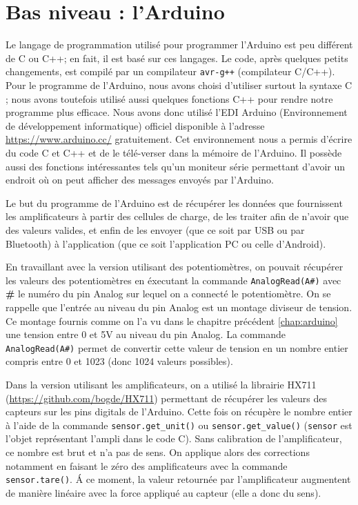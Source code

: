 \documentclass{polytech/polytech}
\begin{document}
\section{Bas niveau : l'Arduino}
\label{sec:logiciel_bas}

Le langage de programmation utilisé pour programmer l'Arduino est peu différent de C ou C++; en fait, il est basé sur ces langages. Le code, après quelques petits changements, est compilé par un compilateur \texttt{avr-g++} (compilateur C/C++). Pour le programme de l'Arduino, nous avons choisi d'utiliser surtout la syntaxe C ; nous avons toutefois utilisé aussi quelques fonctions C++ pour rendre notre programme plus efficace. Nous avons donc utilisé l'EDI Arduino (Environnement de développement informatique) officiel disponible à l'adresse \url{https://www.arduino.cc/} gratuitement. Cet environnement nous a permis d'écrire du code C et C++ et de le télé-verser dans la mémoire de l'Arduino. Il possède aussi des fonctions intéressantes tels qu'un moniteur série permettant d'avoir un endroit où on peut afficher des messages envoyés par l'Arduino.

Le but du programme de l'Arduino est de récupérer les données que fournissent les amplificateurs à partir des cellules de charge, de les traiter afin de n'avoir que des valeurs valides, et enfin de les envoyer (que ce soit par USB ou par Bluetooth) à l'application (que ce soit l'application PC ou celle d'Android).

En travaillant avec la version utilisant des potentiomètres, on pouvait récupérer les valeurs des potentiomètres en éxecutant la commande \texttt{AnalogRead(A\#)} avec \textbf{\#} le numéro du pin Analog sur lequel on a connecté le potentiomètre. On se rappelle que l'entrée au niveau du pin Analog est un montage diviseur de tension. Ce montage fournis comme on l'a vu dans le chapitre précédent \ref{chap:arduino} une tension entre 0 et 5V au niveau du pin Analog. La commande  \texttt{AnalogRead(A\#)} permet de convertir cette valeur de tension en un nombre entier compris entre 0 et 1023 (donc 1024 valeurs possibles).

Dans la version utilisant les amplificateurs, on a utilisé la librairie HX711 (\url{https://github.com/bogde/HX711}) permettant de récupérer les valeurs des capteurs sur les pins digitals de l'Arduino. 
Cette fois on récupère le nombre entier à l'aide de la commande \texttt{sensor.get\_unit()} ou \texttt{sensor.get\_value()} (\texttt{sensor} est l'objet représentant l'ampli dans le code C). 
Sans calibration de l'amplificateur, ce nombre est brut et n'a pas de sens. 
On applique alors des corrections notamment en faisant le zéro des amplificateurs avec la commande \texttt{sensor.tare()}.
 \'A ce moment, la valeur retournée par l'amplificateur augmentent de manière linéaire avec la force appliqué au capteur (elle a donc du sens).
\end{document}
